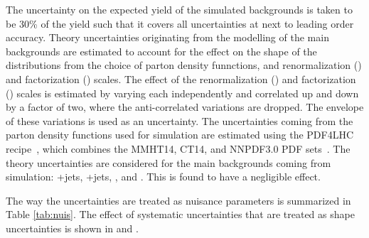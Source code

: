  The uncertainty on the expected yield of the simulated backgrounds is taken to be 30\% of the yield such that it covers all uncertainties at next to leading order accuracy. Theory uncertainties  originating from the modelling of the main backgrounds are estimated to account for the effect on the shape of the distributions from the choice of parton density funnctions, and renormalization (\muR) and factorization (\muF) scales. The effect of the  renormalization (\muR) and factorization (\muF) scales is estimated by varying each independently and correlated up and down by a factor of two, where the anti-correlated variations are dropped. The envelope of these variations is used as an uncertainty. The uncertainties coming from the parton density functions  used for simulation are estimated using the PDF4LHC recipe~\cite{Ball:2017nwa}, which combines the MMHT14, CT14, and NNPDF3.0 PDF sets~\cite{Ball:2017nwa}. The theory uncertainties are considered for the main backgrounds coming from simulation: \WZ+jets, \ZZ+jets, \ttZ, and \tZq. This is found to have a negligible effect.

 The way the uncertainties are treated as nuisance parameters is summarized in Table \ref{tab:nuis}. The effect of systematic uncertainties that are treated as shape uncertainties is shown in  and  . 

